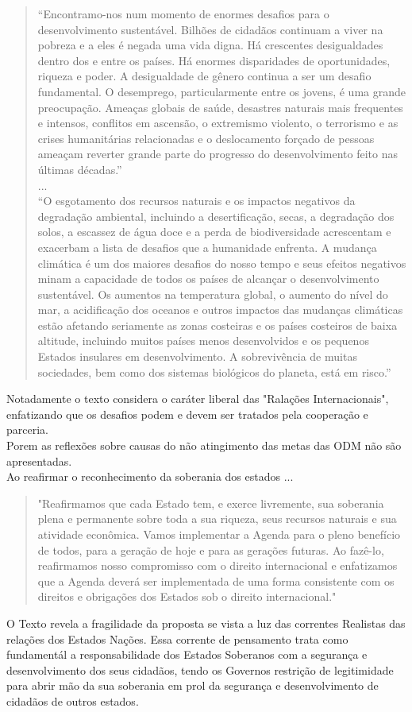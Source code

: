 \begin{quotation}
``Encontramo-nos num momento de enormes desafios para o desenvolvimento sustentável. Bilhões de cidadãos continuam a viver na pobreza e a eles é negada uma vida digna. Há crescentes desigualdades dentro dos e entre os países. Há enormes disparidades de oportunidades, riqueza e poder. A desigualdade de gênero continua a ser um desafio fundamental. O desemprego, particularmente entre os jovens, é uma grande preocupação. Ameaças globais de saúde, desastres naturais mais frequentes e intensos, conflitos em ascensão, o extremismo violento, o terrorismo e as crises humanitárias relacionadas e o deslocamento forçado de pessoas ameaçam reverter grande parte do progresso do desenvolvimento feito nas últimas décadas.''\\
...\\
``O esgotamento dos recursos naturais e os impactos negativos da degradação ambiental, incluindo a desertificação, secas, a degradação dos solos, a escassez de água doce e a perda de biodiversidade acrescentam e exacerbam a lista de desafios que a humanidade enfrenta. A mudança climática é um dos maiores desafios do nosso tempo e seus efeitos negativos minam a capacidade de todos os países de alcançar o desenvolvimento sustentável. Os aumentos na temperatura global, o aumento do nível do mar, a acidificação dos oceanos e outros impactos das mudanças climáticas estão afetando seriamente as zonas costeiras e os países costeiros de baixa altitude, incluindo muitos países menos desenvolvidos e os pequenos Estados insulares em desenvolvimento. A sobrevivência de muitas sociedades, bem como dos sistemas biológicos do planeta, está em risco.''\\
\end{quotation}
Notadamente o texto considera o caráter liberal das "Ralações Internacionais", enfatizando que os desafios podem e devem ser tratados pela cooperação e parceria.\\
Porem as reflexões sobre causas do não atingimento das metas das ODM não são apresentadas.\\
Ao reafirmar o reconhecimento da soberania dos estados ...\
\begin{quotation}
  "Reafirmamos que cada Estado tem, e exerce livremente, sua soberania plena e permanente sobre toda a sua riqueza, seus recursos naturais e sua atividade econômica. Vamos implementar a Agenda para o pleno benefício de todos, para a geração de hoje e para as gerações futuras. Ao fazê-lo, reafirmamos nosso compromisso com o direito internacional e enfatizamos que a Agenda deverá ser implementada de uma forma consistente com os direitos e obrigações dos Estados sob o direito internacional."
\end{quotation}
O Texto revela a fragilidade da proposta se vista a luz das correntes Realistas das relações dos Estados Nações. Essa corrente de pensamento trata como fundamentál a responsabilidade dos Estados Soberanos com a segurança e desenvolvimento  dos seus cidadãos, tendo os Governos restrição de legitimidade para abrir mão da sua soberania em prol da segurança e desenvolvimento de cidadãos de outros estados.\cite{jackson_sorensen_relacoes_internacionais} \\
